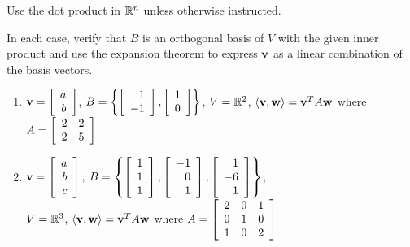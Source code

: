 \begin{multicols}{2}
\noindent Use the dot product in $\mathbb{R}^n$ unless otherwise instructed.

\begin{ex}
In each case, verify that $B$ is an orthogonal basis of $V$ with the given inner product and use the expansion theorem to express $\textbf{v}$ as a linear combination of the basis vectors.

\begin{enumerate}[leftmargin=1em,label={\alph*.}]
\item $\textbf{v} = 
\left[ \begin{array}{r}
a \\
b
\end{array} \right]$, $B =
\left\{
\left[ \begin{array}{r}
1 \\
-1
\end{array} \right]
,
\left[ \begin{array}{r}
1 \\
0
\end{array} \right]
\right\}$, $V = \mathbb{R}^2$, \newline $\langle \textbf{v}, \textbf{w} \rangle = \textbf{v}^T A \textbf{w}$  where  $A = 
\left[ \begin{array}{rr}
2 & 2 \\
2 & 5
\end{array} \right]$

\item $\textbf{v} = 
\left[ \begin{array}{r}
a \\
b \\
c
\end{array} \right]$, $B =
\left\{
\left[ \begin{array}{r}
1 \\
1 \\
1
\end{array} \right]
, 
\left[ \begin{array}{r}
-1 \\
0 \\
1
\end{array} \right]
, 
\left[ \begin{array}{r}
1 \\
-6 \\
1
\end{array} \right]
\right\}$, \\ $V = \mathbb{R}^3$, $\langle \textbf{v}, \textbf{w} \rangle = \textbf{v}^T A \textbf{w}$  where $A = 
\left[ \begin{array}{rrr}
2 & 0 & 1 \\
0 & 1 & 0 \\
1 & 0 & 2 
\end{array} \right]
$


\end{enumerate}
\end{ex}
\end{multicols}
